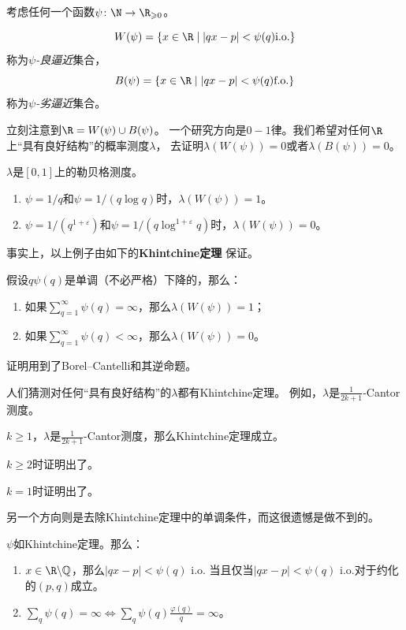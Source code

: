 考虑任何一个函数$\psi \colon \N \to \R_{\geqslant 0}$。
\begin{definition}
    \[W(\psi) = \left\{x \in \R \mid |qx-p|<\psi(q) \text{i.o.}\right\}\]称为\emph{$\psi$-良逼近}集合，
     \[B(\psi) = \left\{x \in \R \mid |qx-p|<\psi(q) \text{f.o.}\right\}\]称为\emph{$\psi$-劣逼近}集合。
\end{definition}
立刻注意到$\R = W(\psi) \cup B(\psi)$。
一个研究方向是$0-1$律。我们希望对任何$\R$上``具有良好结构''的概率测度$\lambda$，
去证明$\lambda(W(\psi)) = 0$或者$\lambda(B(\psi)) = 0$。
\begin{example}
    $\lambda$是$[0,1]$上的勒贝格测度。
    \begin{enumerate}
        \item $\psi = 1/q$和$\psi = 1/(q\log q)$时，$\lambda(W(\psi)) = 1$。
        \item $\psi = 1/(q^{1+\varepsilon})$和$\psi = 1/(q\log^{1+\varepsilon}q)$时，$\lambda(W(\psi)) = 0$。
    \end{enumerate}
\end{example}
事实上，以上例子由如下的\textbf{Khintchine定理} 保证。
\begin{theorem}[Khintchine 1926]
    假设$q\psi(q)$是单调（不必严格）下降的，那么：
\begin{enumerate}
    \item 如果$\displaystyle \sum_{q = 1}^\infty \psi(q) = \infty$，那么$\lambda(W(\psi)) = 1$；
\item 如果$\displaystyle \sum_{q = 1}^\infty \psi(q) < \infty$，那么$\lambda(W(\psi)) = 0$。
\end{enumerate}
\end{theorem}
\begin{remark}
    证明用到了Borel--Cantelli和其逆命题。
\end{remark}
人们猜测对任何“具有良好结构”的$\lambda$都有Khintchine定理。
例如，$\lambda$是$\displaystyle \frac{1}{2k+1}$-Cantor测度。
\begin{conjecture}
    $k \geqslant 1$，$\lambda$是$\displaystyle \frac{1}{2k+1}$-Cantor测度，那么Khintchine定理成立。
\end{conjecture}
\begin{theorem}[2023, Inno]
$k \geqslant 2$时证明出了。
\end{theorem}
\begin{theorem}[2024, preprint]
    $k = 1$时证明出了。
\end{theorem}
另一个方向则是去除Khintchine定理中的单调条件，而这很遗憾是做不到的。
\begin{lemma}
    $\psi$如Khintchine定理。那么：
    \begin{enumerate}
        \item $x \in \R\backslash \Q$，那么$|qx-p|<\psi(q)$ i.o.
        当且仅当$|qx-p|<\psi(q)$ i.o.对于约化的$(p,q)$成立。
        \item $\displaystyle \sum_q \psi(q) = \infty \iff \sum_q \psi(q)\frac{\varphi(q)}{q} = \infty$。
    \end{enumerate}
\end{lemma}
